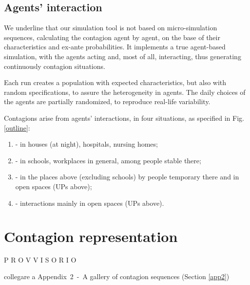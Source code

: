 \documentclass[graybox]{svmult}
\begin{document}
\subsection{Agents' interaction}
\label{inter}

We underline that our simulation tool is not based on micro-simulation sequences, calculating the contagion agent by agent, on the base of their characteristics and ex-ante probabilities. It implements a true agent-based simulation, with the agents acting and, most of all, interacting, thus generating continuously contagion situations.

Each run creates a population with expected characteristics, but also with random specifications, to assure the heterogeneity in agents. The daily choices of the agents are partially randomized, to reproduce real-life variability.

Contagions arise from agents' interactions, in four situations, as specified in Fig. \ref{outline}:

\begin{enumerate}[label=\Alph*]

\item - in houses (at night), hospitals, nursing homes;

\item - in schools, workplaces in general, among people stable there;

\item - in the places above (excluding schools) by people temporary there and in open spaces (UPs above);

\item - interactions mainly in open spaces (UPs above).

\end{enumerate}

\section{Contagion representation}
\label{contag}

P R O V V I S O R I O

collegare a Appendix~2~-~A gallery of contagion sequences (Section \ref{app2})
\end{document}
